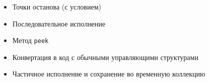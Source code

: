 \begin{frame}
\frametitle{\insertsection} 
\framesubtitle{\insertsubsection}
\begin{itemize}
	\item Точки останова (с условием)
	\item Последовательное исполнение
	\item Метод \texttt{peek}
	\item Конвертация в код с обычными управляющими структурами
	\item Частичное исполнение и сохранение во временную коллекцию
\end{itemize}
\end{frame}

